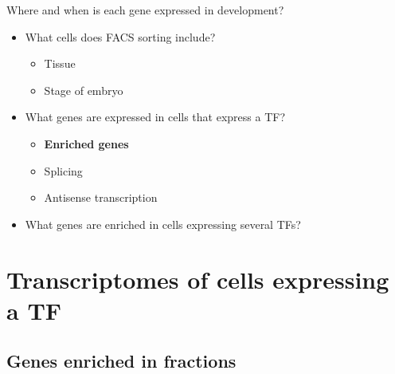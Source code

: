 \documentclass[serif,9pt]{beamer}
\begin{document}
\begin{frame}{Where and when is each gene expressed in development?}
\begin{itemize}
\item What cells does FACS sorting include?
\begin{itemize}
\item Tissue
\item Stage of embryo
\end{itemize}
\item What genes are expressed in cells that express a TF?
\begin{itemize}
\item {\bf Enriched genes}
\item Splicing
\item Antisense transcription
\end{itemize}
\item What genes are enriched in cells expressing several TFs?
\end{itemize}
\end{frame}

\section{Transcriptomes of cells expressing a TF}

\subsection{Genes enriched in fractions}
\end{document}
